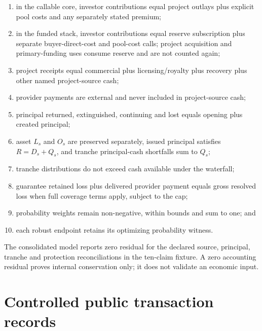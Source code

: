 \documentclass[11pt,a4paper]{article}
\begin{document}
\begin{enumerate}
  \item in the callable core, investor contributions equal project outlays plus explicit pool costs and any separately stated premium;
  \item in the funded stack, investor contributions equal reserve subscription plus separate buyer-direct-cost and pool-cost calls; project acquisition and primary-funding uses consume reserve and are not counted again;
  \item project receipts equal commercial plus licensing/royalty plus recovery plus other named project-source cash;
  \item provider payments are external and never included in project-source cash;
  \item principal returned, extinguished, continuing and lost equals opening plus created principal;
  \item asset \(L_s\) and \(O_s\) are preserved separately, issued principal satisfies \(R=D_s+Q_s\), and tranche principal-cash shortfalls sum to \(Q_s\);
  \item tranche distributions do not exceed cash available under the waterfall;
  \item guarantee retained loss plus delivered provider payment equals gross resolved loss when full coverage terms apply, subject to the cap;
  \item probability weights remain non-negative, within bounds and sum to one; and
  \item each robust endpoint retains its optimizing probability witness.
\end{enumerate}

The consolidated model reports zero residual for the declared source, principal, tranche and protection reconciliations in the ten-claim fixture. A zero accounting residual proves internal conservation only; it does not validate an economic input.

\section{Controlled public transaction records}
\label{app:transactions}
\end{document}
